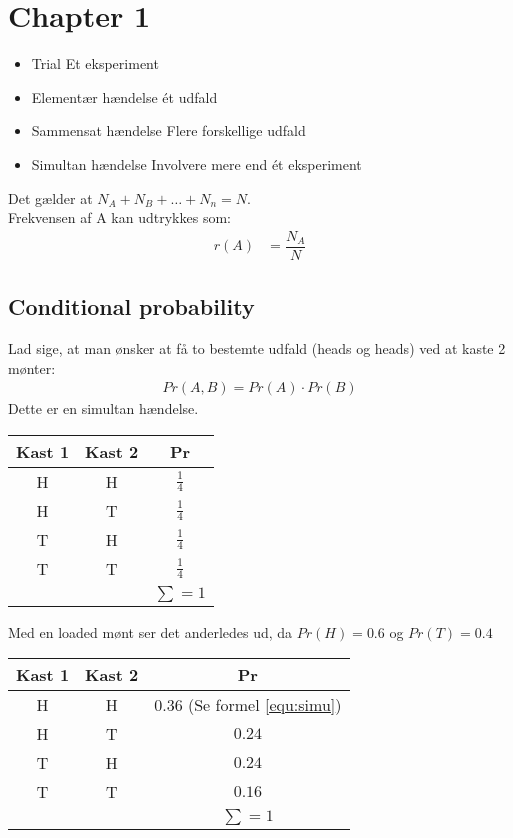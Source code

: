 \documentclass[Main]{subfiles}
\begin{document}
\chapter{Chapter 1}

\begin{itemize}
\item Trial
\subitem Et eksperiment

\item Elementær hændelse
\subitem ét udfald

\item Sammensat hændelse 
\subitem Flere forskellige udfald

\item Simultan hændelse
\subitem Involvere mere end ét eksperiment
\end{itemize}

Det gælder at $N_A+N_B+\ldots+N_n = N$.
\\
Frekvensen af A kan udtrykkes som:
\begin{align*}
r(A) &= \dfrac{N_A}{N}
\end{align*}





\section{Conditional probability}
Lad sige, at man ønsker at få to bestemte udfald (heads og heads) ved at kaste 2 mønter:
\begin{align}
Pr(A,B) = Pr(A) \cdot Pr(B) \label{equ:simu}
\end{align}
Dette er en simultan hændelse.

\begin{table}[H]
\begin{tabular}{ccc}
Kast 1 & Kast 2 & Pr\\ \hline
H & H & $\frac{1}{4}$\\
H & T & $\frac{1}{4}$\\
T & H & $\frac{1}{4}$\\
T & T & $\frac{1}{4}$\\ \hline
& & $\sum = 1$
\end{tabular}
\end{table}

Med en loaded mønt ser det anderledes ud, da $Pr(H) = 0.6$ og $Pr(T)=0.4$
\begin{table}[H]
\begin{tabular}{ccc}
Kast 1 & Kast 2 & Pr\\ \hline
H & H & $0.36$ (Se formel \ref{equ:simu})\\
H & T & $0.24$\\
T & H & $0.24$\\
T & T & $0.16$\\ \hline
& & $\sum = 1$
\end{tabular}
\end{table}
\end{document}
